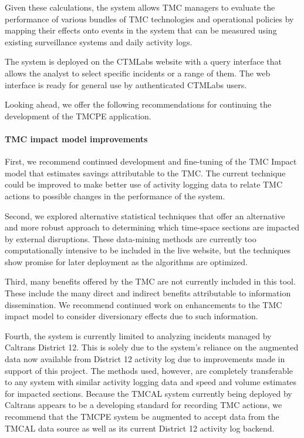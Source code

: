 \documentclass[12pt]{report}
\newcounter{time}
\newcounter{space}
\begin{document}
Given these calculations, the system allows \ac{TMC} managers to evaluate the
performance of various bundles of \ac{TMC} technologies and operational policies
by mapping their effects onto events in the system that can be measured using
existing surveillance systems and daily activity logs.  

The system is deployed on the \ac{CTMLabs} website with a query interface that
allows the analyst to select specific incidents or a range of them.  The web
interface is ready for general use by authenticated \ac{CTMLabs} users.

Looking ahead, we offer the following recommendations for continuing the
development of the \ac{TMCPE} application.  

\paragraph{TMC impact model improvements}

First, we recommend continued development and fine-tuning of the TMC Impact
model that estimates savings attributable to the \ac{TMC}.  The current
technique could be improved to make better use of activity logging data to
relate \ac{TMC} actions to possible changes in the performance of the system.  

Second, we explored alternative statistical techniques that
offer an alternative and more robust approach to determining which time-space
sections are impacted by external disruptions.  These data-mining methods
are currently too computationally intensive to be included in the live website,
but the techniques show promise for later deployment as the algorithms are
optimized.

Third, many benefits offered by the \ac{TMC} are not currently
included in this tool.  These include the many direct and indirect
benefits attributable to information dissemination.  We recommend
continued work on enhancements to the \ac{TMC} impact model to
consider diversionary effects due to such information.

Fourth, the system is currently limited to analyzing incidents managed
by Caltrans District 12.  This is solely due to the system's reliance
on the augmented data now available from District 12 activity log due
to improvements made in support of this project.  The methods used,
however, are completely transferable to any system with similar
activity logging data and speed and volume estimates for impacted
sections.  Because the \ac{TMCAL} system currently being deployed by
Caltrans appears to be a developing standard for recording \ac{TMC}
actions, we recommend that the \ac{TMCPE} system be augmented to
accept data from the \ac{TMCAL} data source as well as its current
District 12 activity log backend.
\end{document}
